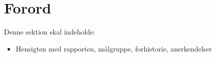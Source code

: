 \section{Forord}
Denne sektion skal indeholde:

\begin{itemize}
    \item Hensigten med rapporten, målgruppe, forhistorie, anerkendelser
\end{itemize}{}
